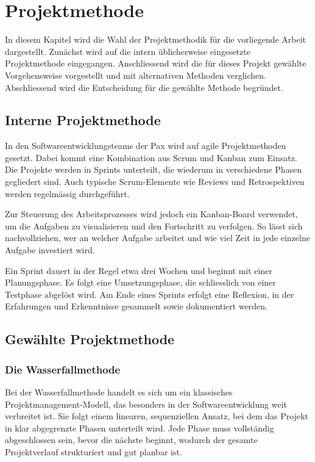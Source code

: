\chapter{Projektmethode}

\vspace{-3em}

In diesem Kapitel wird die Wahl der Projektmethodik für die vorliegende Arbeit dargestellt. Zunächst wird auf die intern üblicherweise eingesetzte Projektmethode eingegangen. Anschliessend wird die für dieses Projekt gewählte Vorgehensweise vorgestellt und mit alternativen Methoden verglichen. Abschliessend wird die Entscheidung für die gewählte Methode begründet.

\section{Interne Projektmethode}

In den Softwareentwicklungsteams der Pax wird auf agile Projektmethoden gesetzt. Dabei kommt eine Kombination aus Scrum und Kanban zum Einsatz. Die Projekte werden in Sprints unterteilt, die wiederum in verschiedene Phasen gegliedert sind. Auch typische Scrum-Elemente wie Reviews und Retrospektiven werden regelmässig durchgeführt.

Zur Steuerung des Arbeitsprozesses wird jedoch ein Kanban-Board verwendet, um die Aufgaben zu visualisieren und den Fortschritt zu verfolgen. So lässt sich nachvollziehen, wer an welcher Aufgabe arbeitet und wie viel Zeit in jede einzelne Aufgabe investiert wird.

Ein Sprint dauert in der Regel etwa drei Wochen und beginnt mit einer Planungsphase. Es folgt eine Umsetzungsphase, die schliesslich von einer Testphase abgelöst wird. Am Ende eines Sprints erfolgt eine Reflexion, in der Erfahrungen und Erkenntnisse gesammelt sowie dokumentiert werden.

\section{Gewählte Projektmethode}

\subsection{Die Wasserfallmethode}

Bei der Wasserfallmethode handelt es sich um ein klassisches Projektmanagement-Modell, das besonders in der Softwareentwicklung weit verbreitet ist. Sie folgt einem linearen, sequenziellen Ansatz, bei dem das Projekt in klar abgegrenzte Phasen unterteilt wird. Jede Phase muss vollständig abgeschlossen sein, bevor die nächste beginnt, wodurch der gesamte Projektverlauf strukturiert und gut planbar ist.

